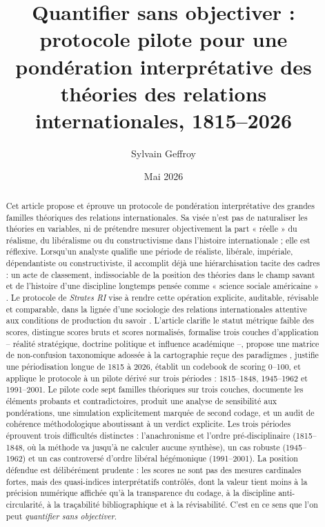 \documentclass[11pt,a4paper]{article}
\begin{document}
\title{Quantifier sans objectiver : protocole pilote pour une pondération interprétative des théories des relations internationales, 1815--2026}

\author{Sylvain Geffroy}

\date{Mai 2026}

\maketitle
\begin{abstract}
Cet article propose et éprouve un protocole de pondération interprétative des grandes familles théoriques des relations internationales. Sa visée n'est pas de naturaliser les théories en variables, ni de prétendre mesurer objectivement la part « réelle » du réalisme, du libéralisme ou du constructivisme dans l'histoire internationale ; elle est réflexive. Lorsqu'un analyste qualifie une période de réaliste, libérale, impériale, dépendantiste ou constructiviste, il accomplit déjà une hiérarchisation tacite des cadres : un acte de classement, indissociable de la position des théories dans le champ savant et de l'histoire d'une discipline longtemps pensée comme « science sociale américaine » \citep{hoffmann1977american,bourdieu1976champ}. Le protocole de \emph{Strates RI} vise à rendre cette opération explicite, auditable, révisable et comparable, dans la lignée d'une sociologie des relations internationales attentive aux conditions de production du savoir \citep{badie1992retournement,devin2002sociologie}. L'article clarifie le statut métrique faible des scores, distingue scores bruts et scores normalisés, formalise trois couches d'application -- réalité stratégique, doctrine politique et influence académique --, propose une matrice de non-confusion taxonomique adossée à la cartographie reçue des paradigmes \citep{battistella2012theories}, justifie une périodisation longue de 1815 à 2026, établit un codebook de scoring 0--100, et applique le protocole à un pilote dérivé sur trois périodes : 1815--1848, 1945--1962 et 1991--2001. Le pilote code sept familles théoriques sur trois couches, documente les éléments probants et contradictoires, produit une analyse de sensibilité aux pondérations, une simulation explicitement marquée de second codage, et un audit de cohérence méthodologique aboutissant à un verdict explicite. Les trois périodes éprouvent trois difficultés distinctes : l'anachronisme et l'ordre pré-disciplinaire (1815--1848, où la méthode va jusqu'à ne calculer aucune synthèse), un cas robuste (1945--1962) et un cas controversé d'ordre libéral hégémonique (1991--2001). La position défendue est délibérément prudente : les scores ne sont pas des mesures cardinales fortes, mais des quasi-indices interprétatifs contrôlés, dont la valeur tient moins à la précision numérique affichée qu'à la transparence du codage, à la discipline anti-circularité, à la traçabilité bibliographique et à la révisabilité. C'est en ce sens que l'on peut \emph{quantifier sans objectiver}.
\end{abstract}
\end{document}
